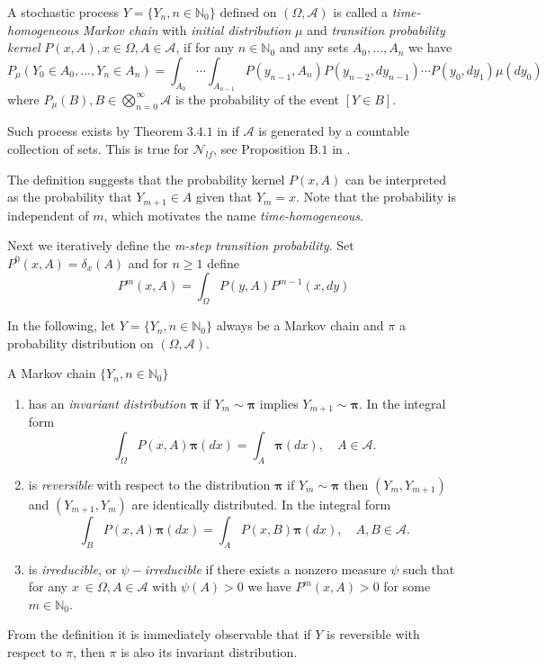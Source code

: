 \begin{definition} A stochastic process $Y=\{Y_n,n \in \mathbb N_0\}$ defined on $(\Omega,\mathcal A)$ is called a \textit{time-homogeneous Markov chain} with \textit{initial distribution} $\mu$ and \textit{transition probability kernel} $P(x,A),x\in\Omega,A \in \mathcal A$, if for any $n\in \mathbb N_0$ and any sets $A_0,\dots,A_n$ we have
$$P_\mu(Y_0\in A_0,\dots, Y_n \in A_n) = \int_{A_0} \cdots \int_{A_{n-1}} P(y_{n-1},A_n) P(y_{n-2},dy_{n-1}) \cdots P(y_0,dy_1)\mu(dy_0)$$
where $P_\mu(B), B \in \bigotimes^\infty_{n=0} \mathcal A$ is the probability of the event $[Y\in B]$.
\end{definition}

Such process exists by Theorem $3.4.1$ in \cite{MeynTweedie1993} if $\mathcal A$ is generated by a countable collection of sets. This is true for $\mathcal N_{lf}$, see Proposition B$.1$ in \cite{MollerWaagepetersen2003}. \newline

The definition suggests that the probability kernel $P(x,A)$ can be interpreted as the probability that $Y_{m+1} \in A$ given that $Y_{m}=x$. Note that the probability is independent of $m$, which motivates the name \textit{time-homogeneous}.

Next we iteratively define the \textit{m-step transition probability}. Set $P^0(x,A) = \delta_x(A)$ and for $n\geq 1$ define
$$P^m(x,A) = \int_\Omega P(y,A) P^{m-1} (x,dy)$$


In the following, let $Y=\{Y_n, n\in \mathbb N_0\}$ always be a Markov chain and $\pi$ a probability distribution on $(\Omega,\mathcal A)$.

\begin{definition}
A Markov chain $\{Y_n, n \in \mathbb N_0\}$ 
\begin{enumerate}
\item has an \textit{invariant distribution} $\mathbf \pi$ if $Y_m \sim \mathbf\pi$ implies $Y_{m+1}\sim \mathbf\pi$. In the integral form
$$\int_\Omega P(x,A) \mathbf\pi(dx) = \int_A \mathbf\pi(dx), \quad A \in \mathcal A.$$
\item is \textit{reversible} with respect to the distribution $\mathbf \pi$ if $Y_m \sim \mathbf\pi$ then $(Y_m,Y_{m+1})$ and $(Y_{m+1},Y_m)$ are identically distributed. In the integral form
$$\int_B P(x,A) \mathbf\pi(dx) = \int_A P(x,B) \mathbf\pi(dx), \quad A,B\in\mathcal A .$$
\item is \textit{irreducible}, or $\psi-$\textit{irreducible} if there exists a nonzero measure $\psi$ such that for any $x~\in \Omega, A\in\mathcal A$ with $\psi(A)>0$ we have $P^m(x,A)>0$ for some $m\in\mathbb N_0$.
\end{enumerate}
\end{definition}
From the definition it is immediately observable that if $Y$ is reversible with respect to $\pi$, then $\pi$ is also its invariant distribution.



